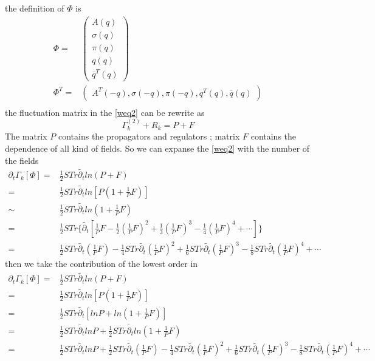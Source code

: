 \documentclass[UTF8]{article}
\begin{document}
the definition of $\Phi$ is
\begin{equation}
\begin{split}
\Phi=&
\begin{pmatrix}
 A(q)\\\sigma(q)\\\pi(q)\\q(q)\\\overline{q}^T(q)
\end{pmatrix}\\
\Phi^T=&
\begin{pmatrix}
A^T(-q),\sigma(-q),\pi(-q),q^T(q),\overline{q}(q)
\end{pmatrix}\\
\end{split}
\end{equation}
the fluctuation matrix in the \eqref{weq2} can be rewrite as
\begin{equation}
\Gamma^{(2)}_{k}+R_k=P+F
\end{equation}
The matrix $P$ contains the propagators and regulators ; matrix $F$ contains the dependence of 
all kind of fields. So we can expanse the \eqref{weq2} with the number of the fields
\begin{equation}
\begin{split}
\partial_t\Gamma_k[\Phi]=&\frac{1}{2}STr\widetilde{\partial_t}ln(P+F)\\
=&\frac{1}{2}STr\widetilde{\partial_t}ln[P(1+\frac{1}{P}F)]\\
\sim&\frac{1}{2}STr\widetilde{\partial_t}ln(1+\frac{1}{P}F)\\
=&\frac{1}{2}STr\bigg\{\widetilde{\partial_t}[\frac{1}{P}F-\frac{1}{2}(\frac{1}{P}F)^2+\frac{1}{3}
(\frac{1}{P}F)^3-\frac{1}{4}(\frac{1}{P}F)^4+\cdots]\bigg\}\\
=&\frac{1}{2}STr\widetilde{\partial_t}(\frac{1}{P}F)-\frac{1}{4}STr\widetilde{\partial_t}
(\frac{1}{P}F)^2+\frac{1}{6}STr\widetilde{\partial_t}(\frac{1}{P}F)^3-\frac{1}{8}STr\widetilde
{\partial_t}(\frac{1}{P}F)^4+\cdots
\end{split}
\end{equation}
then we take the contribution of the lowest order in
\begin{equation}
\begin{split}
\partial_t\Gamma_k[\Phi]=&\frac{1}{2}STr\widetilde{\partial_t}ln(P+F)\\
=&\frac{1}{2}STr\widetilde{\partial_t}ln[P(1+\frac{1}{P}F)]\\
=&\frac{1}{2}STr\widetilde{\partial_t}[lnP+ln(1+\frac{1}{P}F)]\\
=&\frac{1}{2}STr\widetilde{\partial_t}lnP+\frac{1}{2}STr\widetilde{\partial_t}ln(1+\frac{1}{P}F)\\
=&\frac{1}{2}STr\widetilde{\partial_t}lnP+\frac{1}{2}STr\widetilde{\partial_t}(\frac{1}{P}F)
-\frac{1}{4}STr\widetilde{\partial_t}(\frac{1}{P}F)^2
+\frac{1}{6}STr\widetilde{\partial_t}(\frac{1}{P}F)^3
-\frac{1}{8}STr\widetilde{\partial_t}(\frac{1}{P}F)^4+\cdots
\end{split}
\end{equation}
\end{document}
